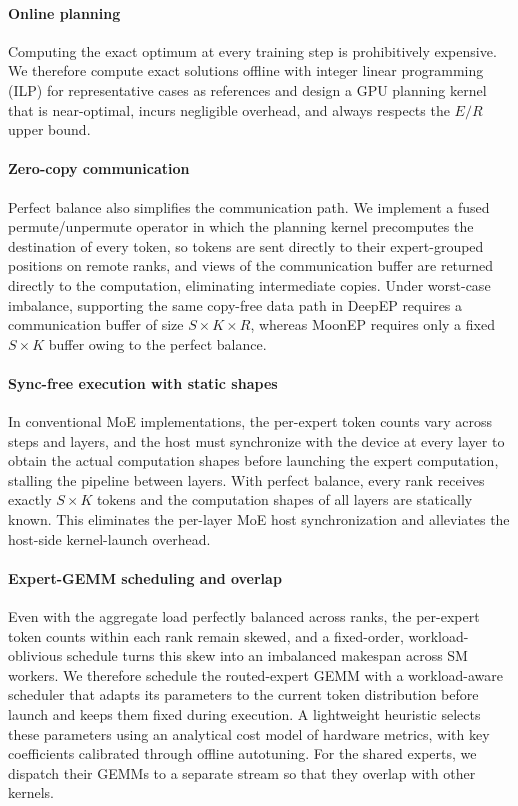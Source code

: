 \paragraph{Online planning}
Computing the exact optimum at every training step is prohibitively expensive.
We therefore compute exact solutions offline with integer linear programming (ILP) for representative cases as references and design a GPU planning kernel that is near-optimal, incurs negligible overhead, and always respects the $E/R$ upper bound.

\paragraph{Zero-copy communication}
Perfect balance also simplifies the communication path.
We implement a fused permute/unpermute operator in which the planning kernel precomputes the destination of every token, so tokens are sent directly to their expert-grouped positions on remote ranks, and views of the communication buffer are returned directly to the computation, eliminating intermediate copies.
Under worst-case imbalance, supporting the same copy-free data path in DeepEP requires a communication buffer of size $S \times K \times R$, whereas MoonEP requires only a fixed $S \times K$ buffer owing to the perfect balance.

\paragraph{Sync-free execution with static shapes}
In conventional MoE implementations, the per-expert token counts vary across steps and layers, and the host must synchronize with the device at every layer to obtain the actual computation shapes before launching the expert computation, stalling the pipeline between layers.
With perfect balance, every rank receives exactly $S \times K$ tokens and the computation shapes of all layers are statically known. This eliminates the per-layer MoE host synchronization and alleviates the host-side kernel-launch overhead.


\paragraph{Expert-GEMM scheduling and overlap}
Even with the aggregate load perfectly balanced across ranks, the per-expert token counts within each rank remain skewed, and a fixed-order, workload-oblivious schedule turns this skew into an imbalanced makespan across SM workers.
We therefore schedule the routed-expert GEMM with a workload-aware scheduler that adapts its parameters to the current token distribution before launch and keeps them fixed during execution.
A lightweight heuristic selects these parameters using an analytical cost model of hardware metrics, with key coefficients calibrated through offline autotuning.
For the shared experts, we dispatch their GEMMs to a separate stream so that they overlap with other kernels.

